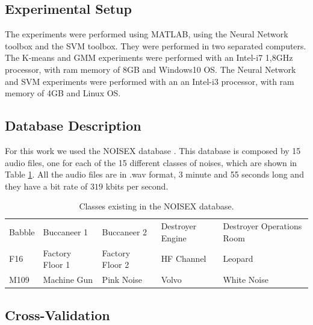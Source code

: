 \documentclass[12pt]{article}
\begin{document}
\subsection{Experimental Setup} \label{exp:setup}


The experiments were performed using MATLAB, using the Neural Network toolbox and the SVM toolbox. They were performed in two separated computers. The K-means and GMM experiments were performed with an Intel-i7 1,8GHz processor, with ram memory of 8GB and Windows10 OS. The Neural Network and SVM experiments were performed with an an Intel-i3 processor, with ram memory of 4GB and Linux OS.

\subsection{Database Description} \label{exp:data}


For this work we used the NOISEX database \cite{varga1993assessment}. This database is composed by 15 audio files, one for each of the 15 different classes of noises, which are shown in Table \ref{tab:noisex}. All the audio files are in .wav format, 3 minute and 55 seconds long and they have a bit rate of $319$ kbits per second.

\begin{table}[ht]
	\centering
	\caption{Classes existing in the NOISEX database.}
	\label{tab:noisex}
	\begin{tabular}{lllll}
		\hline
		Babble & Buccaneer 1 & Buccaneer 2 & Destroyer Engine& Destroyer Operations Room\\
		F16 & Factory Floor 1 & Factory Floor 2 & HF Channel & Leopard\\
		M109 & Machine Gun & Pink Noise & Volvo & White Noise\\
		\hline
	\end{tabular}
\end{table}

\subsection{Cross-Validation} \label{exp:crossv}
\end{document}
